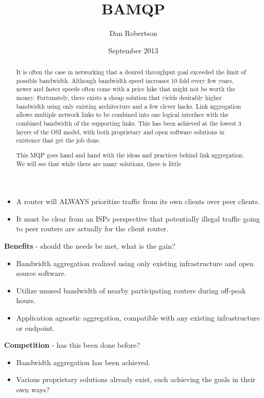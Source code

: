 \documentclass[12pt]{article}
\begin{document}
{\begin{itemize}
			\item A router will ALWAYS prioritize traffic from its own clients over peer clients.
			\item It must be clear from an ISPs perspective that potentially illegal traffic going to peer routers are actually for the client router.
		\end{itemize}
	{\bf Benefits} - should the needs be met, what is the gain?\\
		\begin{itemize}
			\item Bandwidth aggregation realized using only existing infrastructure and open source software.
			\item Utilize unused bandwidth of nearby participating routers during off-peak hours.
			\item Application agnostic aggregation, compatible with any existing infrastructure or endpoint.
		\end{itemize}
	{\bf Competition} - has this been done before?\\
		\begin{itemize}
			\item Bandwidth aggregation has been achieved.
			\item Various proprietary solutions already exist, each achieving the goals in their own ways?
		\end{itemize}
}


\title{BAMQP}
\author{Dan Robertson}
\date{September 2013}
\maketitle

\begin{abstract}
	It is often the case in networking that a desired throughput goal exceeded the limit of possible bandwidth. Although bandwidth speed increases 10 fold every few years, newer and faster speeds often come with a price hike that might not be worth the money. Fortunately, there exists a cheap solution that yields desirably higher bandwidth using only existing architecture and a few clever hacks. Link aggregation allows multiple network links to be combined into one logical interface with the combined bandwidth of the supporting links. This has been achieved at the lowest 3 layers of the OSI model, with both proprietary and open software solutions in existence that get the job done.

	This MQP goes hand and hand with the ideas and practices behind link aggregation. We will see that while there are many solutions, there is little 
\end{abstract}
\end{document}
